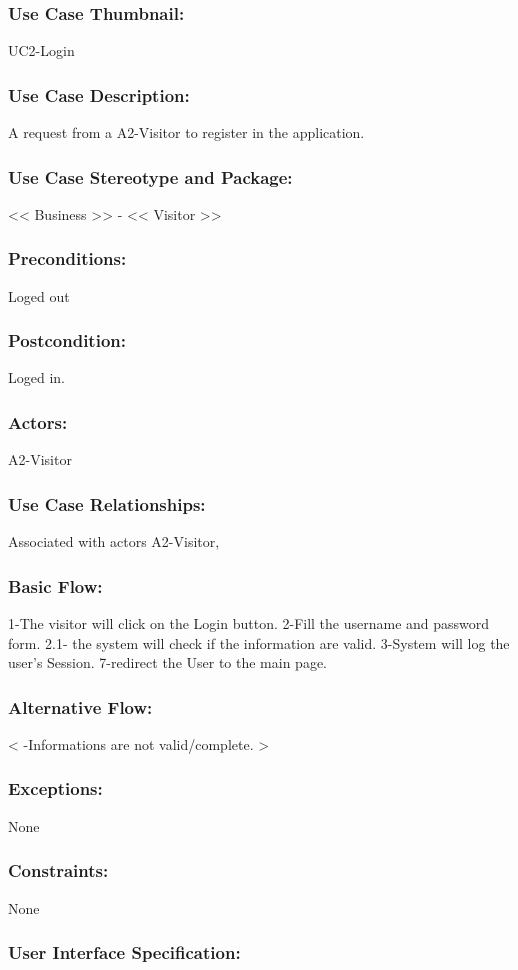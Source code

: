 \documentclass[11pt, openany]{report}
\begin{document}
\subsubsection{Use Case Thumbnail:}
UC2-Login
\subsubsection{Use Case Description:}
A request from a A2-Visitor to register in the application.
\subsubsection{Use Case Stereotype and Package:}
<< Business >> - << Visitor >>
\subsubsection{Preconditions:}
Loged out
\subsubsection{Postcondition:}
Loged in.
\subsubsection{Actors:}
A2-Visitor
\subsubsection{Use Case Relationships:}
Associated with actors A2-Visitor,
\subsubsection{Basic Flow:}
1-The visitor will click on the Login button.
2-Fill the username and password form.
  2.1- the system will check if the information are valid.
3-System will log the user's Session.
7-redirect the User to the main page.
\subsubsection{Alternative Flow:}
< -Informations are not valid/complete. >
\subsubsection{Exceptions:}
None
\subsubsection{Constraints:}
None
\subsubsection{User Interface Specification:}
\end{document}
